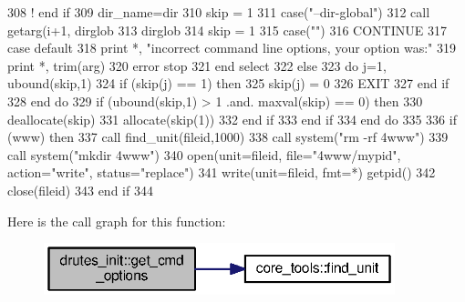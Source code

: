 \begin{DoxyCode}
308 \textcolor{comment}{!                 end if}
309                   dir_name=dir
310                   skip = 1
311             \textcolor{keywordflow}{case}(\textcolor{stringliteral}{"--dir-global"})
312                   \textcolor{keyword}{call }getarg(i+1, dirglob%
313                   dirglob%
314                   skip = 1            
315             \textcolor{keywordflow}{case}(\textcolor{stringliteral}{""})
316                     \textcolor{keywordflow}{CONTINUE}
317 \textcolor{keywordflow}{            case default}
318                     print *, \textcolor{stringliteral}{"incorrect command line options, your option was:"}
319                     print *, trim(arg)
320                     error stop
321 \textcolor{keywordflow}{          end select}
322         \textcolor{keywordflow}{else}
323           \textcolor{keywordflow}{do} j=1, ubound(skip,1)
324             \textcolor{keywordflow}{if} (skip(j) == 1) \textcolor{keywordflow}{then}
325               skip(j) = 0
326               \textcolor{keywordflow}{EXIT}  
327 \textcolor{keywordflow}{            end if}
328 \textcolor{keywordflow}{          end do}
329           \textcolor{keywordflow}{if} (ubound(skip,1) > 1 .and. maxval(skip) == 0) \textcolor{keywordflow}{then}
330             \textcolor{keyword}{deallocate}(skip)
331             \textcolor{keyword}{allocate}(skip(1))
332 \textcolor{keywordflow}{          end if}
333 \textcolor{keywordflow}{        end if}
334 \textcolor{keywordflow}{      end do}
335       
336       \textcolor{keywordflow}{if} (www) \textcolor{keywordflow}{then}
337         \textcolor{keyword}{call }find_unit(fileid,1000)
338         \textcolor{keyword}{call }system(\textcolor{stringliteral}{"rm -rf 4www"})
339         \textcolor{keyword}{call }system(\textcolor{stringliteral}{"mkdir 4www"})
340         \textcolor{keyword}{open}(unit=fileid, file=\textcolor{stringliteral}{"4www/mypid"}, action=\textcolor{stringliteral}{"write"}, status=\textcolor{stringliteral}{"replace"})
341         \textcolor{keyword}{write}(unit=fileid, fmt=*) getpid()
342         \textcolor{keyword}{close}(fileid)
343 \textcolor{keywordflow}{      end if}
344     
\end{DoxyCode}


Here is the call graph for this function\+:\nopagebreak
\begin{figure}[H]
\begin{center}
\leavevmode
\includegraphics[width=289pt]{namespacedrutes__init_a1545ed5db34f1bfba97c067c63633bd6_cgraph}
\end{center}
\end{figure}




